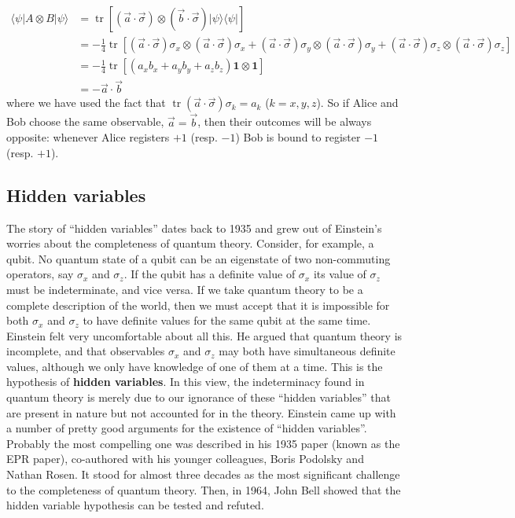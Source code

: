\documentclass[fleqn]{article}
\begin{document}
\[
\begin{aligned}
  \langle\psi|A\otimes B|\psi\rangle
  & = \operatorname{tr}\left[
      (\vec{a}\cdot\vec\sigma)\otimes(\vec{b}\cdot\vec\sigma) |\psi\rangle\langle\psi|
    \right]
\\& = -\frac{1}{4} \operatorname{tr}\left[
      (\vec{a}\cdot\vec\sigma)\sigma_x \otimes(\vec{a}\cdot\vec\sigma)\sigma_x
      + (\vec{a}\cdot\vec\sigma)\sigma_y \otimes(\vec{a}\cdot\vec\sigma)\sigma_y
      + (\vec{a}\cdot\vec\sigma)\sigma_z \otimes(\vec{a}\cdot\vec\sigma)\sigma_z
    \right]
\\& = -\frac{1}{4} \operatorname{tr}\left[
      (a_x b_x + a_y b_y + a_z b_z) \mathbf{1}\otimes\mathbf{1}
    \right]
\\& = -\vec{a}\cdot\vec{b}
\end{aligned}
\]
where we have used the fact that \(\operatorname{tr}(\vec{a}\cdot\vec\sigma)\sigma_k = a_k\) (\(k=x,y,z\)).
So if Alice and Bob choose the same observable, \(\vec{a} = \vec{b}\), then their outcomes will be always opposite: whenever Alice registers \(+1\) (resp. \(-1\)) Bob is bound to register \(-1\) (resp. \(+1\)).

\hypertarget{hidden-variables}{%
\subsection{Hidden variables}\label{hidden-variables}}

The story of ``hidden variables'' dates back to 1935 and grew out of Einstein's worries about the completeness of quantum theory.
Consider, for example, a qubit.
No quantum state of a qubit can be an eigenstate of two non-commuting operators, say \(\sigma_x\) and \(\sigma_z\).
If the qubit has a definite value of \(\sigma_x\) its value of \(\sigma_z\) must be indeterminate, and vice versa.
If we take quantum theory to be a complete description of the world, then we must accept that it is impossible for both \(\sigma_x\) and \(\sigma_z\) to have definite values for the same qubit at the same time.
Einstein felt very uncomfortable about all this.
He argued that quantum theory is incomplete, and that observables \(\sigma_x\) and \(\sigma_z\) may both have simultaneous definite values, although we only have knowledge of one of them at a time.
This is the hypothesis of \textbf{hidden variables}.
In this view, the indeterminacy found in quantum theory is merely due to our ignorance of these ``hidden variables'' that are present in nature but not accounted for in the theory.
Einstein came up with a number of pretty good arguments for the existence of ``hidden variables''.
Probably the most compelling one was described in his 1935 paper (known as the EPR paper), co-authored with his younger colleagues, Boris Podolsky and Nathan Rosen.
It stood for almost three decades as the most significant challenge to the completeness of quantum theory.
Then, in 1964, John Bell showed that the hidden variable hypothesis can be tested and refuted.
\end{document}
